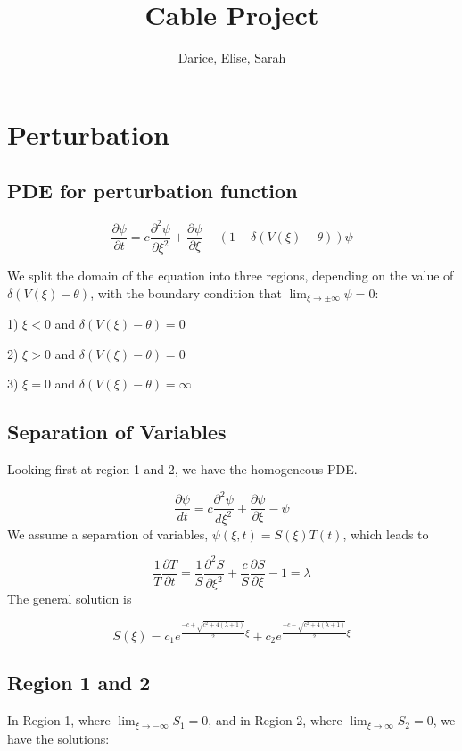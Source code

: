 \documentclass[12pt]{article}
\title{Cable Project}
\author{Darice, Elise, Sarah}
\begin{document}
\maketitle
\section{Perturbation}
\subsection{PDE for perturbation function}

\begin{equation} \label{pde_nh}
\frac{\partial \psi}{\partial t} = c \frac{\partial^2\psi}{\partial\xi^2} + \frac{\partial\psi}{\partial\xi} - (1 - \delta(V(\xi)-\theta))\psi
\end{equation} 

We split the domain of the equation into three regions, depending on the value of $\delta(V(\xi)-\theta)$, with the boundary condition that $\lim_{\xi \to \pm \infty}\psi = 0$:

1) $\xi < 0$ and $\delta(V(\xi)-\theta) = 0$

2) $\xi > 0$ and $\delta(V(\xi)-\theta) = 0$ 

3) $\xi = 0$ and $\delta(V(\xi)-\theta) = \infty$


\subsection{Separation of Variables}
Looking first at region 1 and 2, we have the homogeneous PDE.

\begin{equation} \label{pde_h}
\frac{\partial \psi}{dt} = c \frac{\partial^2\psi}{d\xi^2} + \frac{\partial\psi}{\partial\xi} - \psi 
\end{equation}
We assume a separation of variables, $\psi(\xi,t) = S(\xi)T(t)$, which leads to

$$ \frac{1}{T}\frac{\partial T}{\partial t} = \frac{1}{S}\frac{\partial^2S}{\partial\xi^2} + \frac{c}{S}\frac{\partial S}{\partial\xi} - 1 = \lambda $$
The general solution is

$$ S(\xi) = c_1e^{\frac{-c+\sqrt{c^2+4(\lambda+1)}}{2}\xi} + c_2e^{\frac{-c-\sqrt{c^2+4(\lambda+1)}}{2}\xi} $$

\subsection{Region 1 and 2}
In Region 1, where $\lim_{\xi \to -\infty}S_1 = 0$, and in Region 2, where $\lim_{\xi \to \infty}S_2 = 0$, we have the solutions:
\end{document}
